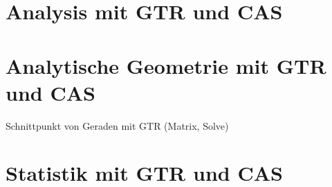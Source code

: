 \section{Analysis mit GTR und CAS}

\section{Analytische Geometrie mit GTR und CAS}

Schnittpunkt von Geraden mit GTR (Matrix, Solve)

\section{Statistik mit GTR und CAS}

